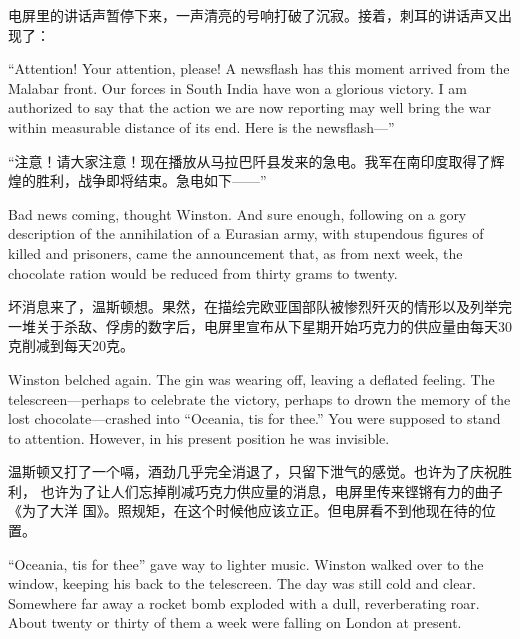 \begin{paracol}{2}
\switchcolumn

电屏里的讲话声暂停下来，一声清亮的号响打破了沉寂。接着，刺耳的讲话声又出现了：

\switchcolumn*

``Attention! Your attention, please! A newsflash has this moment arrived
from the Malabar front. Our forces in South India have won a glorious
victory. I am authorized to say that the action we are now reporting may
well bring the war within measurable distance of its end. Here is the
newsflash---''

\switchcolumn

``注意！请大家注意！现在播放从马拉巴阡县发来的急电。我军在南印度取得了辉煌的胜利，战争即将结束。急电如下——''

\switchcolumn*

Bad news coming, thought Winston. And sure enough, following on a gory
description of the annihilation of a Eurasian army, with stupendous
figures of killed and prisoners, came the announcement that, as from
next week, the chocolate ration would be reduced from thirty grams to
twenty.

\switchcolumn

坏消息来了，温斯顿想。果然，在描绘完欧亚国部队被惨烈歼灭的情形以及列举完一堆关于杀敌、俘虏的数字后，电屏里宣布从下星期开始巧克力的供应量由每天30克削减到每天20克。

\switchcolumn*

Winston belched again. The gin was wearing off, leaving a deflated
feeling. The telescreen---perhaps to celebrate the victory, perhaps to
drown the memory of the lost chocolate---crashed into ``Oceania,
\textquotesingle tis for thee.'' You were supposed to stand to attention.
However, in his present position he was invisible.

\switchcolumn

温斯顿又打了一个嗝，酒劲几乎完全消退了，只留下泄气的感觉。也许为了庆祝胜利，
也许为了让人们忘掉削减巧克力供应量的消息，电屏里传来铿锵有力的曲子《为了大洋
国》。照规矩，在这个时候他应该立正。但电屏看不到他现在待的位置。

\switchcolumn*

``Oceania, \textquotesingle tis for thee'' gave way to lighter music.
Winston walked over to the window, keeping his back to the telescreen.
The day was still cold and clear. Somewhere far away a rocket bomb
exploded with a dull, reverberating roar. About twenty or thirty of them
a week were falling on London at present.

\switchcolumn


\end{paracol}
